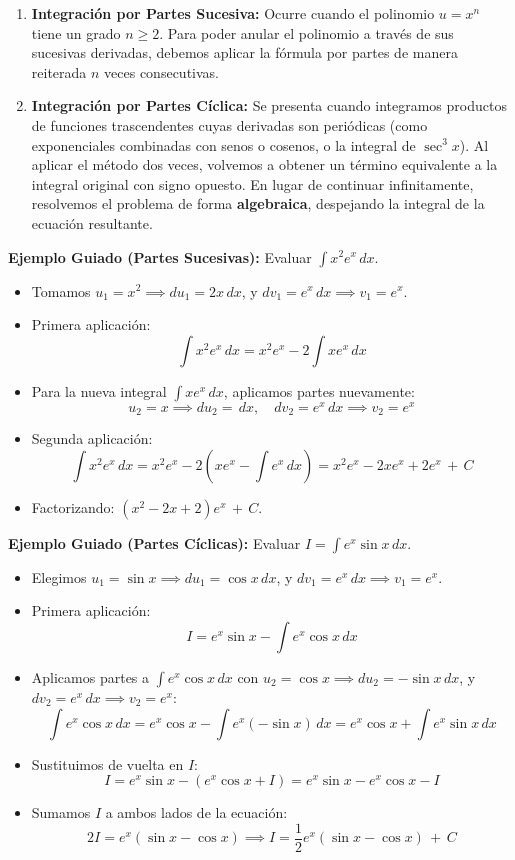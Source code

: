 \documentclass[12pt, letterpaper]{article}
\newcommand{\dx}{\,dx}
\newcommand{\CC}{\,+\,C}
\begin{document}
\begin{enumerate}[leftmargin=*]
  \item \textbf{Integración por Partes Sucesiva:}
    Ocurre cuando el polinomio $u = x^n$ tiene un grado $n \ge 2$. Para poder anular el polinomio a través de sus sucesivas derivadas, debemos aplicar la fórmula por partes de manera reiterada $n$ veces consecutivas.
    
  \item \textbf{Integración por Partes Cíclica:}
    Se presenta cuando integramos productos de funciones trascendentes cuyas derivadas son periódicas (como exponenciales combinadas con senos o cosenos, o la integral de $\sec^3 x$). Al aplicar el método dos veces, volvemos a obtener un término equivalente a la integral original con signo opuesto. En lugar de continuar infinitamente, resolvemos el problema de forma \textbf{algebraica}, despejando la integral de la ecuación resultante.
\end{enumerate}

\noindent\textbf{Ejemplo Guiado (Partes Sucesivas):} Evaluar $\int x^2 e^x \dx$.
\begin{itemize}
  \item Tomamos $u_1 = x^2 \implies du_1 = 2x\dx$, y $dv_1 = e^x\dx \implies v_1 = e^x$.
  \item Primera aplicación:
    $$\int x^2 e^x \dx = x^2 e^x - 2\int x e^x \dx$$
  \item Para la nueva integral $\int x e^x \dx$, aplicamos partes nuevamente:
    $$u_2 = x \implies du_2 = \dx, \quad dv_2 = e^x\dx \implies v_2 = e^x$$
  \item Segunda aplicación:
    $$\int x^2 e^x \dx = x^2 e^x - 2\left(x e^x - \int e^x \dx\right) = x^2 e^x - 2x e^x + 2e^x \CC$$
  \item Factorizando: $(x^2 - 2x + 2)e^x \CC$.
\end{itemize}

\noindent\textbf{Ejemplo Guiado (Partes Cíclicas):} Evaluar $I = \int e^x \sin x \dx$.
\begin{itemize}
  \item Elegimos $u_1 = \sin x \implies du_1 = \cos x \dx$, y $dv_1 = e^x \dx \implies v_1 = e^x$.
  \item Primera aplicación:
    $$I = e^x \sin x - \int e^x \cos x \dx$$
  \item Aplicamos partes a $\int e^x \cos x \dx$ con $u_2 = \cos x \implies du_2 = -\sin x \dx$, y $dv_2 = e^x \dx \implies v_2 = e^x$:
    $$\int e^x \cos x \dx = e^x \cos x - \int e^x (-\sin x)\dx = e^x \cos x + \int e^x \sin x \dx$$
  \item Sustituimos de vuelta en $I$:
    $$I = e^x \sin x - \left(e^x \cos x + I\right) = e^x \sin x - e^x \cos x - I$$
  \item Sumamos $I$ a ambos lados de la ecuación:
    $$2I = e^x(\sin x - \cos x) \implies I = \frac{1}{2}e^x(\sin x - \cos x) \CC$$
\end{itemize}
\end{document}
